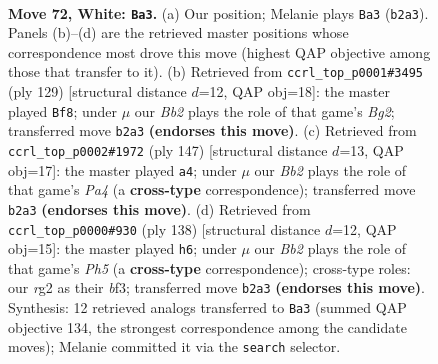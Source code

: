 \documentclass[11pt]{article}
\begin{document}
\clearpage

\begin{figure}[p]\centering
\begin{subfigure}{0.46\textwidth}\centering
\resizebox{\linewidth}{!}{%
\newchessgame
\chessboard[
  setfen={6k1/8/7R/8/bPp5/8/1B4r1/1K6 w - - 3 72},
  showmover=false,
  pgfstyle=straightmove, color=movearrow, markmove={b2-a3}
]}
\caption{}
\end{subfigure}\hfill
\begin{subfigure}{0.46\textwidth}\centering
\resizebox{\linewidth}{!}{%
\newchessgame
\chessboard[
  setfen={8/2R3b1/5k2/1B6/3r4/5K2/P7/8 b - - 7 65},
  showmover=false,
  pgfstyle=straightmove, color=movearrow, markmove={g7-f8}
]}
\caption{}
\end{subfigure}
\\[4pt]
\begin{subfigure}{0.46\textwidth}\centering
\resizebox{\linewidth}{!}{%
\newchessgame
\chessboard[
  setfen={8/3k4/8/p1R1K3/7r/4P3/8/8 b - - 8 74},
  showmover=false,
  pgfstyle=straightmove, color=movearrow, markmove={a5-a4}
]}
\caption{}
\end{subfigure}\hfill
\begin{subfigure}{0.46\textwidth}\centering
\resizebox{\linewidth}{!}{%
\newchessgame
\chessboard[
  setfen={8/2B2r2/4R3/2k4P/7K/5b2/8/8 w - - 5 70},
  showmover=false,
  pgfstyle=straightmove, color=movearrow, markmove={h5-h6}
]}
\caption{}
\end{subfigure}
\caption{\textbf{Move 72, White: \texttt{Ba3}.} (a) Our position; Melanie plays \texttt{Ba3} (\texttt{b2a3}). Panels (b)--(d) are the retrieved master positions whose correspondence most drove this move (highest QAP objective among those that transfer to it). (b) Retrieved from \texttt{ccrl\_top\_p0001\#3495} (ply 129) [structural distance $d$=12, QAP obj=18]: the master played \texttt{Bf8}; under $\mu$ our \emph{Bb2} plays the role of that game's \emph{Bg2}; transferred move \texttt{b2a3} \textbf{(endorses this move)}. (c) Retrieved from \texttt{ccrl\_top\_p0002\#1972} (ply 147) [structural distance $d$=13, QAP obj=17]: the master played \texttt{a4}; under $\mu$ our \emph{Bb2} plays the role of that game's \emph{Pa4} (a \textbf{cross-type} correspondence); transferred move \texttt{b2a3} \textbf{(endorses this move)}. (d) Retrieved from \texttt{ccrl\_top\_p0000\#930} (ply 138) [structural distance $d$=12, QAP obj=15]: the master played \texttt{h6}; under $\mu$ our \emph{Bb2} plays the role of that game's \emph{Ph5} (a \textbf{cross-type} correspondence); cross-type roles: our \emph{r}g2 as their \emph{b}f3; transferred move \texttt{b2a3} \textbf{(endorses this move)}. Synthesis: 12 retrieved analogs transferred to \texttt{Ba3} (summed QAP objective 134, the strongest correspondence among the candidate moves); Melanie committed it via the \texttt{search} selector.}
\label{fig:thought-m142}
\end{figure}
\end{document}
